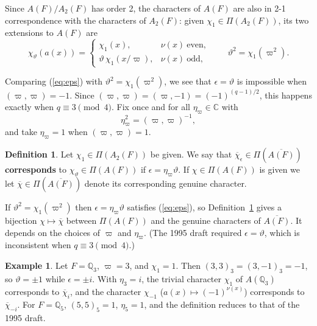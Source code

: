 \documentclass[12pt,letterpaper]{book}
\theoremstyle{plain}
\theoremstyle{definition}
\newtheorem{definition}[theorem]{Definition}
\newtheorem{example}[theorem]{Example}
\theoremstyle{remark}
\theoremstyle{remark}
\begin{document}
Since $A(F)/A_2(F)$ has order 2, the characters of $A(F)$ are
also in 2-1 correspondence with the characters of $A_2(F)$:
given $\chi_1\in \Pi(A_2(F))$, its two extensions to $A(F)$ are
\begin{equation}\label{eq:chi-theta}
\chi_\vartheta (a(x))=
\left\{
\begin{array}{ll}
\chi_1(x), & \nu(x)\ \text{even},\\
\vartheta\, \chi_1(x/\varpi), & \nu(x)\ \text{odd},
\end{array}
\right.
\qquad \vartheta^2 = \chi_1(\varpi^2).
\end{equation}

Comparing (\ref{eq:eps}) with $\vartheta^2=\chi_1(\varpi^2)$, we see that
$\epsilon=\vartheta$ is impossible when $(\varpi,\varpi)=-1$. Since
$(\varpi,\varpi)=(\varpi,-1)=(-1)^{(q-1)/2}$, this happens exactly when
$q\equiv 3\pmod 4$. Fix once and for all $\eta_\varpi\in{\mathbb C}$ with
\[
\eta_\varpi^2=(\varpi,\varpi)^{-1},
\]
and take $\eta_\varpi=1$ when $(\varpi,\varpi)=1$.

\begin{definition} Let $\chi_1\in \Pi(A_2(F))$ be given.
We say that
$\overline{\chi}_\epsilon\in \Pi(\overline{A(F)})$ {\bf corresponds}
to $\chi_\vartheta \in \Pi(A(F))$ if $\epsilon =\eta_\varpi\vartheta$.
If $\chi \in \Pi(A(F))$ is given we let
$\overline{\chi}\in \Pi(\overline{A(F)})$ denote
its corresponding genuine character.
\label{def:corrchar}
\end{definition}

If $\vartheta^2=\chi_1(\varpi^2)$ then $\epsilon=\eta_\varpi\vartheta$
satisfies (\ref{eq:eps}), so Definition~\ref{def:corrchar} gives a
bijection $\chi\mapsto\overline{\chi}$ between $\Pi(A(F))$ and the genuine
characters of $\overline{A(F)}$. It depends on the choices of $\varpi$
and $\eta_\varpi$. (The 1995 draft required $\epsilon=\vartheta$, which is
inconsistent when $q\equiv3\pmod 4$.)

\begin{example}
Let $F={\mathbb Q}_3$, $\varpi=3$, and $\chi_1=1$. Then
$(3,3)_3=(3,-1)_3=-1$, so $\vartheta=\pm1$ while $\epsilon=\pm i$. With
$\eta_3=i$, the trivial character $\chi_{1}$ of $A({\mathbb Q}_3)$
corresponds to $\overline{\chi}_i$, and the character $\chi_{-1}$
($a(x)\mapsto(-1)^{\nu(x)}$) corresponds to $\overline{\chi}_{-i}$. For
$F={\mathbb Q}_5$, $(5,5)_5=1$, $\eta_5=1$, and the definition reduces to
that of the 1995 draft.
\end{example}
\end{document}

